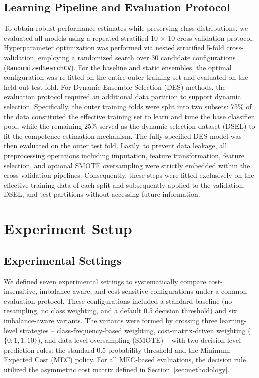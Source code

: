 \documentclass[conference]{IEEEtran}
\begin{document}
\subsection{Learning Pipeline and Evaluation Protocol}
To obtain robust performance estimates while preserving class distributions, we evaluated all models using a repeated stratified 10 $\times$ 10 cross-validation protocol. Hyperparameter optimization was performed via nested stratified 5-fold cross-validation, employing a randomized search over 30 candidate configurations (\texttt{RandomizedSearchCV}). For the baseline and static ensembles, the optimal configuration was re-fitted on the entire outer training set and evaluated on the held-out test fold. For Dynamic Ensemble Selection (DES) methods, the evaluation protocol required an additional data partition to support dynamic selection. Specifically, the outer training folds were split into two subsets: 75\% of the data constituted the effective training set to learn and tune the base classifier pool, while the remaining 25\% served as the dynamic selection dataset (DSEL) to fit the competence estimation mechanism. The fully specified DES model was then evaluated on the outer test fold. Lastly, to prevent data leakage, all preprocessing operations including imputation, feature transformation, feature selection, and optional SMOTE oversampling were strictly embedded within the cross-validation pipelines. Consequently, these steps were fitted exclusively on the effective training data of each split and subsequently applied to the validation, DSEL, and test partitions without accessing future information.

\section{Experiment Setup} \label{sec:experiment-setup}
\subsection{Experimental Settings}

We defined seven experimental settings to systematically compare cost-insensitive, imbalance-aware, and cost-sensitive configurations under a common evaluation protocol. These configurations included a standard baseline (no resampling, no class weighting, and a default 0.5 decision threshold) and six imbalance-aware variants. The variants were formed by crossing three learning-level strategies -- class-frequency-based weighting, cost-matrix-driven weighting ($\{0:1, 1:10\}$), and data-level oversampling (SMOTE) -- with two decision-level prediction rules: the standard 0.5 probability threshold and the Minimum Expected Cost (MEC) policy. For all MEC-based evaluations, the decision rule utilized the asymmetric cost matrix defined in Section~\ref{sec:methodology}.
\end{document}
